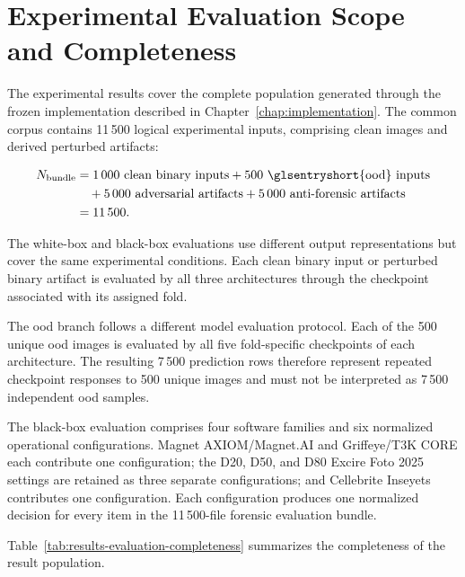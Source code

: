 \section{Experimental Evaluation Scope and Completeness}
\label{sec:results-scope}

The experimental results cover the complete population generated through the
frozen implementation described in Chapter~\ref{chap:implementation}. The
common corpus contains 11\,500 logical experimental inputs, comprising clean
images and derived perturbed artifacts:

\begin{equation}
\begin{aligned}
N_{\mathrm{bundle}}
&=
1\,000\ \text{clean binary inputs}
+
500\ \text{\glsentryshort{ood} inputs}
\\
&\quad
+
5\,000\ \text{adversarial artifacts}
+
5\,000\ \text{anti-forensic artifacts}
\\
&=
11\,500.
\end{aligned}
\end{equation}

The white-box and black-box evaluations use different output
representations but cover the same experimental conditions. Each clean binary
input or perturbed binary artifact is evaluated by all three
architectures through the checkpoint associated with its assigned fold.

The \gls{ood} branch follows a different model evaluation protocol. Each
of the 500 unique \gls{ood} images is evaluated by all five fold-specific
checkpoints of each architecture. The resulting 7\,500 prediction rows
therefore represent repeated checkpoint responses to 500 unique images and
must not be interpreted as 7\,500 independent \gls{ood} samples.

The black-box evaluation comprises four software families and six normalized
operational configurations. Magnet AXIOM/Magnet.AI and Griffeye/T3K CORE each
contribute one configuration; the D20, D50, and D80 Excire Foto 2025 settings
are retained as three separate configurations; and Cellebrite Inseyets
contributes one configuration. Each configuration produces one normalized decision for every
item in the 11\,500-file forensic evaluation bundle.

Table~\ref{tab:results-evaluation-completeness} summarizes the completeness of
the result population.

